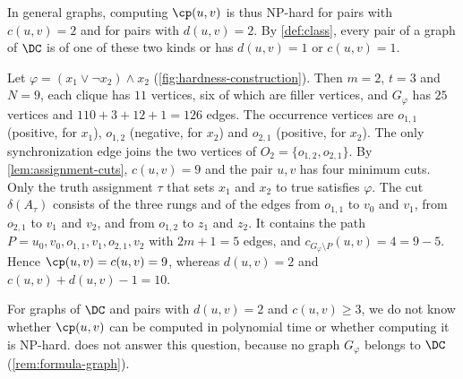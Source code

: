 In general graphs, computing $\cp(u, v)$ is thus NP-hard for pairs with $c(u, v) = 2$ and for pairs with $d(u, v) = 2$.
By \cref{def:class}, every pair of a graph of $\DC$ is of one of these two kinds or has $d(u, v) = 1$ or $c(u, v) = 1$.

\begin{example}
\label{ex:formula-graph}
Let $\varphi = (x_1 \vee \neg x_2) \wedge x_2$ (\cref{fig:hardness-construction}).
Then $m = 2$, $t = 3$ and $N = 9$, each clique has $11$ vertices, six of which are filler vertices, and $G_\varphi$ has $25$ vertices and $110 + 3 + 12 + 1 = 126$ edges.
The occurrence vertices are $o_{1,1}$ (positive, for $x_1$), $o_{1,2}$ (negative, for $x_2$) and $o_{2,1}$ (positive, for $x_2$).
The only synchronization edge joins the two vertices of $O_2 = \{o_{1,2}, o_{2,1}\}$.
By \cref{lem:assignment-cuts}, $c(u, v) = 9$ and the pair $u, v$ has four minimum cuts.
Only the truth assignment $\tau$ that sets $x_1$ and $x_2$ to true satisfies $\varphi$.
The cut $\delta(A_\tau)$ consists of the three rungs and of the edges from $o_{1,1}$ to $v_0$ and $v_1$, from $o_{2,1}$ to $v_1$ and $v_2$, and from $o_{1,2}$ to $z_1$ and $z_2$.
It contains the path $P = u_0, v_0, o_{1,1}, v_1, o_{2,1}, v_2$ with $2m + 1 = 5$ edges, and $c_{G_\varphi \setminus P}(u, v) = 4 = 9 - 5$.
Hence $\cp(u, v) = c(u, v) = 9$, whereas $d(u, v) = 2$ and $c(u, v) + d(u, v) - 1 = 10$.
\end{example}

For graphs of $\DC$ and pairs with $d(u, v) = 2$ and $c(u, v) \geq 3$, we do not know whether $\cp(u, v)$ can be computed in polynomial time or whether computing it is NP-hard.
 does not answer this question, because no graph $G_\varphi$ belongs to $\DC$ (\cref{rem:formula-graph}).
